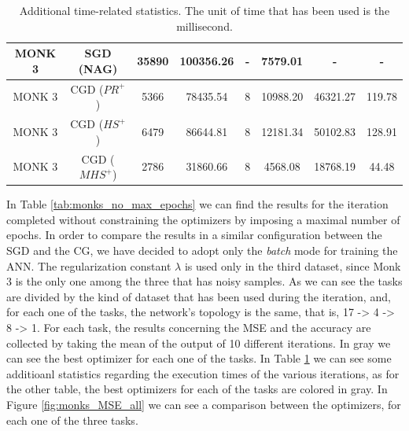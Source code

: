 \begin{table}[H]
\begin{subtable}{\textwidth}
{\begin{tabular}{| c | c | c | c | c | c | c | c |}
                            \hline
                            MONK 3 & SGD (NAG) & 35890 & 100356.26 & - & 7579.01 & - & - \\
                            \hline
                            MONK 3 & CGD ($PR^{+}$) & 5366 & 78435.54 & 8 & 10988.20 & 46321.27 & 119.78 \\
                            \hline
                            MONK 3 & CGD ($HS^{+}$) & 6479 & 86644.81 & 8 & 12181.34 & 50102.83 & 128.91 \\
                            \hline
                            \rowcolor[gray]{.9}
                            MONK 3 & CGD ($MHS^{+}$) & 2786 & 31860.66 & 8 & 4568.08 & 18768.19 & 44.48 \\
                            \hline
                        \end{tabular}
                    }
                \end{subtable}
                \caption{Additional time-related statistics. The unit of time that has been used is the
                millisecond.}
                \label{tab:monks_additional_no_max_epochs}
            \end{table}

            In Table \ref{tab:monks_no_max_epochs} we can find the results for the iteration completed without
            constraining the optimizers by imposing a maximal number of epochs. In order to compare the
            results in a similar configuration between the SGD and the CG, we have decided to adopt only the
            \textit{batch} mode for training the ANN. The regularization constant $\lambda$ is used only in
            the third dataset, since Monk 3 is the only one among the three that has noisy samples. As we can
            see the tasks are divided by the kind of dataset that has been used during the iteration, and, for
            each one of the tasks, the network's topology is the same, that is, 17 -> 4 -> 8 -> 1. For each
            task, the results concerning the MSE and the accuracy are collected by taking the mean of the
            output of 10 different iterations. In gray we can see the best optimizer for each one of the
            tasks. In Table \ref{tab:monks_additional_no_max_epochs} we can see some additioanl statistics
            regarding the execution times of the various iterations, as for the other table, the best
            optimizers for each of the tasks are colored in gray.
            In Figure \ref{fig:monks_MSE_all} we can see a comparison between the optimizers, for each one of
            the three tasks.

